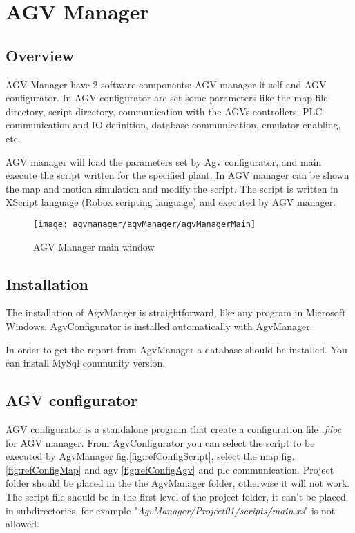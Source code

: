 

\chapter{AGV Manager}

\section{Overview}
AGV Manager have 2 software components: AGV manager it self and AGV configurator.
In AGV configurator are set some parameters like the map file directory, script directory, communication with the AGVs controllers, PLC communication and IO definition, database communication, emulator enabling, etc.

AGV manager will load the parameters set by Agv configurator, and main execute the script written for the specified plant. In AGV manager can be shown the map and motion simulation and modify the script. The script is written in XScript language (Robox scripting language) and executed by AGV manager.

\begin{figure}
	\centering\texttt{[image: agvmanager/agvManager/agvManagerMain]}
	\caption{AGV Manager main window}
	\label{fig:agvManagerMain}
\end{figure}

\section{Installation}
The installation of AgvManger is straightforward, like any program in Microsoft Windows. AgvConfigurator is installed automatically with AgvManager.

In order to get the report from AgvManager a database should be installed. You can install MySql community version.

\section{AGV configurator}

AGV configurator is a standalone program that create a configuration file \textit{.fdoc} for AGV manager. From AgvConfigurator you can select the script to be executed by AgvManager fig.\ref{fig:refConfigScript}, select the map fig.\ref{fig:refConfigMap} and agv \ref{fig:refConfigAgv} and plc communication.
Project folder should be placed in the the AgvManager folder, otherwise it will not work. The script file should be in the first level of the project folder, it can't be placed in subdirectories, for example "\textit{AgvManager/Project01/scripts/main.xs}" is not allowed.

